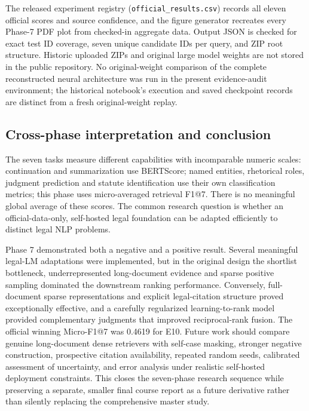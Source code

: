 The released experiment registry (\texttt{official\_results.csv}) records
all eleven official scores and source confidence, and the figure generator
recreates every Phase-7 PDF plot from checked-in aggregate data. Output JSON
is checked for exact test ID coverage, seven unique candidate IDs per query,
and ZIP root structure. Historic uploaded ZIPs and original large model
weights are not stored in the public repository. No original-weight comparison
of the complete reconstructed neural architecture was run in the present
evidence-audit environment; the historical notebook's execution and saved
checkpoint records are distinct from a fresh original-weight replay.

\subsection{Cross-phase interpretation and conclusion}
The seven tasks measure different capabilities with incomparable numeric
scales: continuation and summarization use BERTScore; named entities,
rhetorical roles, judgment prediction and statute identification use their
own classification metrics; this phase uses micro-averaged retrieval F1@7.
There is no meaningful global average of these scores. The common research
question is whether an official-data-only, self-hosted legal foundation can
be adapted efficiently to distinct legal NLP problems.

Phase 7 demonstrated both a negative and a positive result. Several
meaningful legal-LM adaptations were implemented, but in the original design
the shortlist bottleneck, underrepresented long-document evidence and sparse
positive sampling dominated the downstream ranking performance. Conversely,
full-document sparse representations and explicit legal-citation structure
proved exceptionally effective, and a carefully regularized learning-to-rank
model provided complementary judgments that improved reciprocal-rank fusion.
The official winning Micro-F1@7 was 0.4619 for E10. Future work should
compare genuine long-document dense retrievers with self-case masking, stronger
negative construction, prospective citation availability, repeated random
seeds, calibrated assessment of uncertainty, and error analysis under
realistic self-hosted deployment constraints. This closes the seven-phase
research sequence while preserving a separate, smaller final course report
as a future derivative rather than silently replacing the comprehensive
master study.

